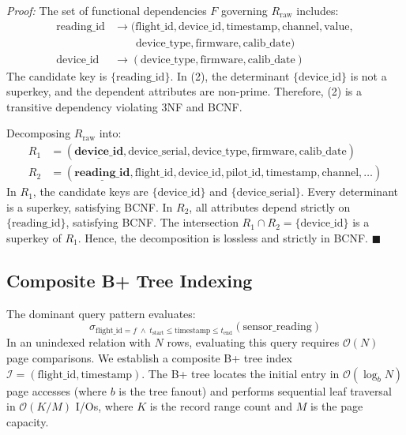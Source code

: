 \documentclass[journal]{IEEEtran}
\begin{document}
\textit{Proof:} 
The set of functional dependencies $F$ governing $R_{\text{raw}}$ includes:
\begin{align}
    \text{reading\_id} &\to (\text{flight\_id}, \text{device\_id}, \text{timestamp}, \text{channel}, \text{value}, \nonumber \\
    &\quad\quad \text{device\_type}, \text{firmware}, \text{calib\_date}) \\
    \text{device\_id} &\to (\text{device\_type}, \text{firmware}, \text{calib\_date})
\end{align}
The candidate key is $\{\text{reading\_id}\}$. In (2), the determinant $\{\text{device\_id}\}$ is not a superkey, and the dependent attributes are non-prime. Therefore, (2) is a transitive dependency violating 3NF and BCNF.

Decomposing $R_{\text{raw}}$ into:
\begin{align*}
    R_1 &= (\mathbf{\underline{device\_id}}, \text{device\_serial}, \text{device\_type}, \text{firmware}, \text{calib\_date}) \\
    R_2 &= (\mathbf{\underline{reading\_id}}, \text{flight\_id}, \text{device\_id}, \text{pilot\_id}, \text{timestamp}, \text{channel}, \dots)
\end{align*}
In $R_1$, the candidate keys are $\{\text{device\_id}\}$ and $\{\text{device\_serial}\}$. Every determinant is a superkey, satisfying BCNF. In $R_2$, all attributes depend strictly on $\{\text{reading\_id}\}$, satisfying BCNF. The intersection $R_1 \cap R_2 = \{\text{device\_id}\}$ is a superkey of $R_1$. Hence, the decomposition is lossless and strictly in BCNF. $\blacksquare$

\subsection{Composite B+ Tree Indexing}
The dominant query pattern evaluates:
\begin{equation}
    \sigma_{\text{flight\_id} = f \;\land\; t_{\text{start}} \le \text{timestamp} \le t_{\text{end}}}(\text{sensor\_reading})
\end{equation}
In an unindexed relation with $N$ rows, evaluating this query requires $\mathcal{O}(N)$ page comparisons. We establish a composite B+ tree index $\mathcal{I} = (\text{flight\_id}, \text{timestamp})$. The B+ tree locates the initial entry in $\mathcal{O}(\log_b N)$ page accesses (where $b$ is the tree fanout) and performs sequential leaf traversal in $\mathcal{O}(K/M)$ I/Os, where $K$ is the record range count and $M$ is the page capacity.
\end{document}
